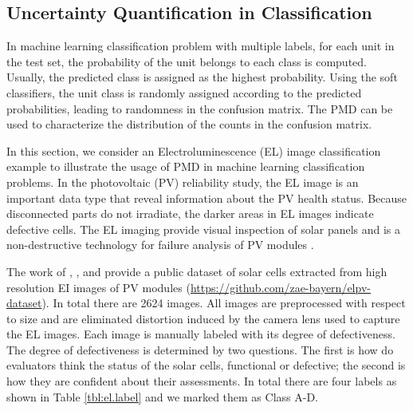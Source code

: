 \documentclass[12pt]{article}
\begin{document}
\subsection{Uncertainty Quantification in Classification}
In machine learning classification problem with multiple labels, for each unit in the test set, the probability of the unit belongs to each class is computed. Usually, the predicted class is assigned as the highest probability. Using the soft classifiers, the unit class is randomly assigned according to the predicted probabilities, leading to randomness in the confusion matrix. The PMD can be used to characterize the distribution of the counts in the confusion matrix.


%

In this section, we consider an Electroluminescence (EL) image classification example to illustrate the usage of PMD in machine learning classification problems. In the photovoltaic (PV) reliability study, the EL image is an important data type that reveal information about the PV health status. Because disconnected parts do not irradiate, the darker areas in EL images indicate defective cells. The EL imaging provide visual inspection of solar panels and is a non-destructive technology for failure analysis of PV modules .

The work of , , and  provide a public dataset of solar cells extracted from high resolution EI images of PV modules (\url{https://github.com/zae-bayern/elpv-dataset}). In total there are 2624 images. All images are preprocessed with respect to size and are eliminated distortion induced by the camera lens used to capture the EL images. Each image is manually labeled  with its degree of defectiveness. The degree of defectiveness is determined by two questions. The first is how do evaluators think the status of the solar cells, functional or defective; the second is how they are confident about their assessments. In total there are four labels as shown in Table \ref{tbl:el.label} and we marked them as Class A-D.
\end{document}
